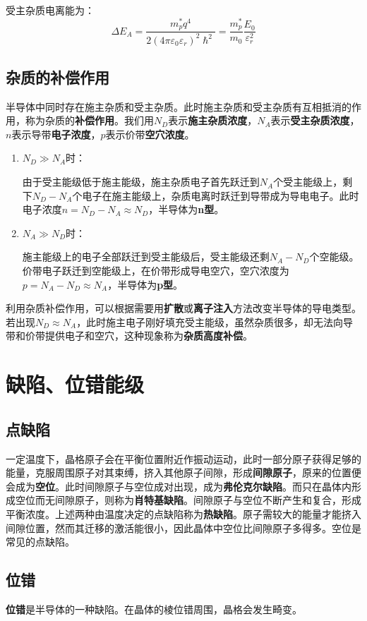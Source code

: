 受主杂质电离能为：
\begin{equation}
    \Delta E_A=\frac{m_p^*q^4}{2(4\pi\varepsilon_0\varepsilon_r)^2\hslash^2}=\frac{m_p^*}{m_0}\frac{E_0}{\varepsilon_r^2}
\end{equation}

\subsection{杂质的补偿作用}

半导体中同时存在施主杂质和受主杂质。此时施主杂质和受主杂质有互相抵消的作用，称为杂质的\textbf{补偿作用}。我们用$N_D$表示\textbf{施主杂质浓度}，$N_A$表示\textbf{受主杂质浓度}，$n$表示导带\textbf{电子浓度}，$p$表示价带\textbf{空穴浓度}。

\begin{enumerate}
    \item $N_D\gg N_A$时：

    由于受主能级低于施主能级，施主杂质电子首先跃迁到$N_A$个受主能级上，剩下$N_D-N_A$个电子在施主能级上，杂质电离时跃迁到导带成为导电电子。此时电子浓度$n=N_D-N_A\approx N_D$，半导体为\textbf{n型}。
    \item $N_A\gg N_D$时：

    施主能级上的电子全部跃迁到受主能级后，受主能级还剩$N_A-N_D$个空能级。价带电子跃迁到空能级上，在价带形成导电空穴，空穴浓度为$p=N_A-N_D\approx N_A$，半导体为\textbf{p型}。
\end{enumerate}

利用杂质补偿作用，可以根据需要用\textbf{扩散}或\textbf{离子注入}方法改变半导体的导电类型。若出现$N_D\approx N_A$，此时施主电子刚好填充受主能级，虽然杂质很多，却无法向导带和价带提供电子和空穴，这种现象称为\textbf{杂质高度补偿}。

\section{缺陷、位错能级}

\subsection{点缺陷}

一定温度下，晶格原子会在平衡位置附近作振动运动，此时一部分原子获得足够的能量，克服周围原子对其束缚，挤入其他原子间隙，形成\textbf{间隙原子}，原来的位置便会成为\textbf{空位}。此时间隙原子与空位成对出现，成为\textbf{弗伦克尔缺陷}。而只在晶体内形成空位而无间隙原子，则称为\textbf{肖特基缺陷}。间隙原子与空位不断产生和复合，形成平衡浓度。上述两种由温度决定的点缺陷称为\textbf{热缺陷}。原子需较大的能量才能挤入间隙位置，然而其迁移的激活能很小，因此晶体中空位比间隙原子多得多。空位是常见的点缺陷。

\subsection{位错}

\textbf{位错}是半导体的一种缺陷。在晶体的棱位错周围，晶格会发生畸变。






